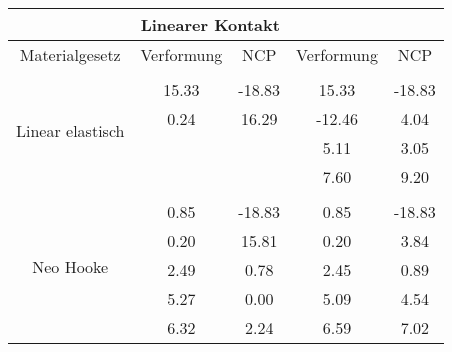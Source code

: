 \begin{table} 
\centering 
\begin{tabular}{c|cc|cc|} 
\cline{2-5} 
 & \multicolumn{2}{|c|}{Linearer Kontakt} &  \\ 
\hline 
\multicolumn{1}{|c|}{Materialgesetz} & \multicolumn{1}{c|}{Verformung} & \multicolumn{1}{c|}{NCP} & \multicolumn{1}{c|}{Verformung} & \multicolumn{1}{c|}{NCP} \\ 
\hline 
\multicolumn{1}{|c|}{\multirow{5}{*}{Linear elastisch}} &\multicolumn{1}{|c|}{} & \multicolumn{1}{|c|}{} & \multicolumn{1}{|c|}{} & \multicolumn{1}{|c|}{} \\ 
\multicolumn{1}{|c|}{} & \multicolumn{1}{|c|}{     15.33} & \multicolumn{1}{|c|}{    -18.83} & \multicolumn{1}{|c|}{     15.33} & \multicolumn{1}{|c|}{    -18.83} \\ 
\multicolumn{1}{|c|}{} & \multicolumn{1}{|c|}{      0.24} & \multicolumn{1}{|c|}{     16.29} & \multicolumn{1}{|c|}{    -12.46} & \multicolumn{1}{|c|}{      4.04} \\ 
\multicolumn{1}{|c|}{} & \multicolumn{1}{|c|}{} & \multicolumn{1}{|c|}{} & \multicolumn{1}{|c|}{      5.11} & \multicolumn{1}{|c|}{      3.05} \\ 
\multicolumn{1}{|c|}{} & \multicolumn{1}{|c|}{} & \multicolumn{1}{|c|}{} & \multicolumn{1}{|c|}{      7.60} & \multicolumn{1}{|c|}{      9.20} \\ 
\hline 
\multicolumn{1}{|c|}{\multirow{6}{*}{Neo Hooke}} &\multicolumn{1}{|c|}{} & \multicolumn{1}{|c|}{} & \multicolumn{1}{|c|}{} & \multicolumn{1}{|c|}{} \\ 
\multicolumn{1}{|c|}{} & \multicolumn{1}{|c|}{      0.85} & \multicolumn{1}{|c|}{    -18.83} & \multicolumn{1}{|c|}{      0.85} & \multicolumn{1}{|c|}{    -18.83} \\ 
\multicolumn{1}{|c|}{} & \multicolumn{1}{|c|}{      0.20} & \multicolumn{1}{|c|}{     15.81} & \multicolumn{1}{|c|}{      0.20} & \multicolumn{1}{|c|}{      3.84} \\ 
\multicolumn{1}{|c|}{} & \multicolumn{1}{|c|}{      2.49} & \multicolumn{1}{|c|}{      0.78} & \multicolumn{1}{|c|}{      2.45} & \multicolumn{1}{|c|}{      0.89} \\ 
\multicolumn{1}{|c|}{} & \multicolumn{1}{|c|}{      5.27} & \multicolumn{1}{|c|}{      0.00} & \multicolumn{1}{|c|}{      5.09} & \multicolumn{1}{|c|}{      4.54} \\ 
\multicolumn{1}{|c|}{} & \multicolumn{1}{|c|}{      6.32} & \multicolumn{1}{|c|}{      2.24} & \multicolumn{1}{|c|}{      6.59} & \multicolumn{1}{|c|}{      7.02} \\ 

\end{tabular}
\end{table}
